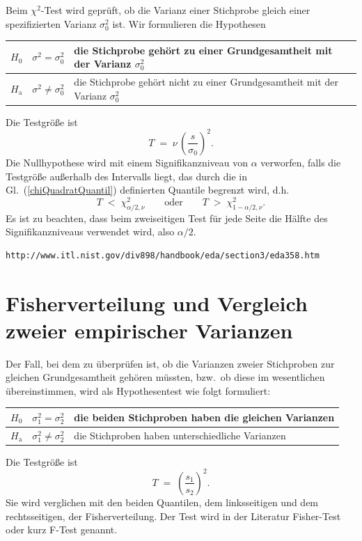Beim $\chi^2$-Test wird geprüft, ob die Varianz einer Stichprobe gleich einer
spezifizierten Varianz $\sigma_0^2$ ist. Wir formulieren die Hypothesen
\begin{center}
\begin{tabular}{c|cl}
$H_0$ & $\sigma^2 = \sigma_0^2$ & die Stichprobe gehört zu einer Grundgesamtheit mit der Varianz $\sigma_0^2$\\
\hline
$H_\mathrm{a}$ & $\sigma^2 \neq \sigma_0^2$ & die Stichprobe gehört nicht zu einer Grundgesamtheit mit der Varianz $\sigma_0^2$
\end{tabular}
\end{center}
Die Testgröße ist
\begin{equation}
T \; = \; \nu \, \left( \frac{s}{\sigma_0} \right)^2 .
\label{chi2testgroesse}
\end{equation}
Die Nullhypothese wird mit einem Signifikanzniveau von $\alpha$
verworfen, falls die Testgröße außerhalb des Intervalls liegt,
das durch die in Gl.~(\ref{chiQuadratQuantil}) definierten Quantile begrenzt wird, d.h.
\begin{equation}
T \; < \; \chi^2_{\alpha/2, \nu}  \qquad \mathrm{oder} \qquad
T \; > \; \chi^2_{1-\alpha/2, \nu} .
\end{equation}
Es ist zu beachten, dass beim zweiseitigen Test für jede Seite die
Hälfte des Signifikanzniveaus verwendet wird, also $\alpha/2$.

\begin{verbatim}
http://www.itl.nist.gov/div898/handbook/eda/section3/eda358.htm
\end{verbatim}


\section{\label{sec:Fischer}Fisherverteilung und Vergleich zweier empirischer Varianzen}

Der Fall, bei dem zu überprüfen ist, ob die Varianzen zweier Stichproben zur gleichen
Grundgesamtheit gehören müssten, bzw.\ ob diese im wesentlichen übereinstimmen, wird
als Hypothesentest wie folgt formuliert:
\begin{center}
\begin{tabular}{c|cl}
$H_0$ & $\sigma_1^2 = \sigma_2^2$ & die beiden Stichproben haben die gleichen Varianzen\\
\hline
$H_\mathrm{a}$ & $\sigma_1^2 \neq \sigma_2^2$ & die Stichproben haben unterschiedliche Varianzen
\end{tabular}
\end{center}
Die Testgröße ist
\begin{equation}
T \; = \; \left( \frac{s_1}{s_2} \right)^2.
\label{Ftestgroesse}
\end{equation}
Sie wird verglichen mit den beiden Quantilen, dem linksseitigen und dem rechtsseitigen, der Fisherverteilung.
Der Test wird in der Literatur Fisher-Test oder kurz F-Test genannt.


